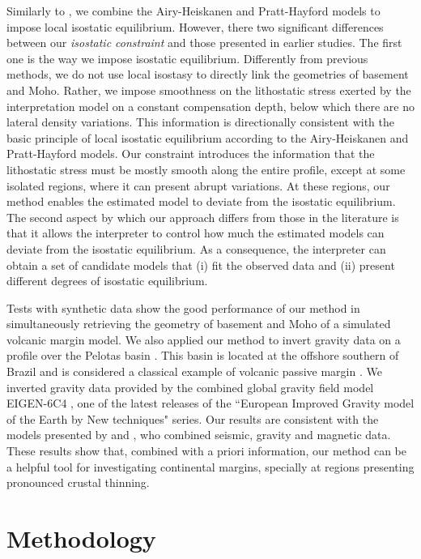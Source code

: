 \documentclass[manuscript]{geophysics}
\begin{document}
Similarly to \citet{ferderer-etal2017}, we combine the Airy-Heiskanen and Pratt-Hayford
models to impose local isostatic equilibrium. However, there two significant differences
between our \textit{isostatic constraint} and those presented in earlier studies.
The first one is the way we impose isostatic equilibrium. Differently from previous 
methods, we do not use local isostasy to directly link the geometries of basement and Moho.
Rather, we impose smoothness on the lithostatic stress exerted by the interpretation 
model on a constant compensation depth, below which there are no lateral density variations.
This information is directionally consistent with the basic principle of 
local isostatic equilibrium according to the Airy-Heiskanen and Pratt-Hayford models.
Our constraint introduces the information that the lithostatic stress must be mostly 
smooth along the entire profile, except at some isolated regions, where it can present abrupt
variations. At these regions, our method enables the estimated model to deviate from the 
isostatic equilibrium.
The second aspect by which our approach differs from those in the literature
is that it allows the interpreter to control how much the 
estimated models can deviate from the isostatic equilibrium.
As a consequence, the interpreter can obtain a set of candidate models 
that (i) fit the observed data and (ii) present different degrees of isostatic equilibrium.

Tests with synthetic data show the good performance of our method in simultaneously
retrieving the geometry of basement and Moho of a simulated volcanic margin
model. We also applied our method to invert 
gravity data on a profile over the Pelotas basin \citep{stica-etal2014}. This basin is
located at the offshore southern of Brazil and is considered a classical example 
of volcanic passive margin \citep{geoffroy2005}. 
We inverted gravity data provided by the combined global gravity field model EIGEN-6C4
\citep{forste2014}, one of the latest releases of the ``European Improved Gravity model of 
the Earth by New techniques" series.
Our results are consistent with the models presented by \citet{stica-etal2014} and
\citet{zalan2015}, who combined seismic, gravity and magnetic data.
These results show that, combined with a priori information, our method can be a helpful tool 
for investigating continental margins, specially at regions presenting pronounced crustal thinning.


\section{Methodology}
\end{document}

